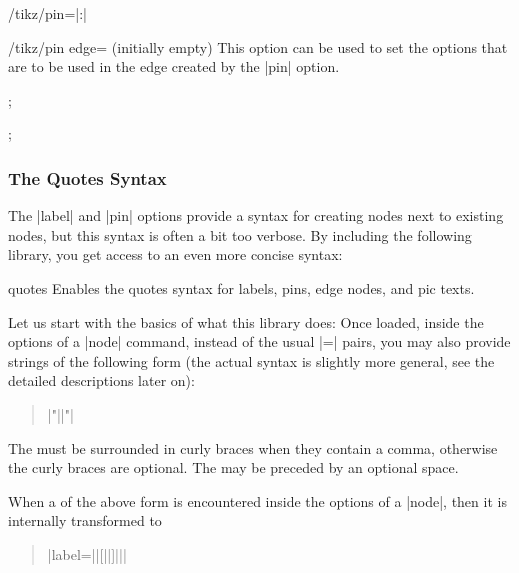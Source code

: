 \begin{key}{/tikz/pin=|:|}
    \begin{key}{/tikz/pin edge= (initially \normalfont empty)}
        This option can be used to set the options that are to be used in the
        edge created by the |pin| option.
\begin{codeexample}[]
\tikz[pin distance=10mm]
  ;
\end{codeexample}
\begin{codeexample}[]
\tikz [every pin edge/.style={},
       initial/.style={pin={[pin distance=5mm,
                             pin edge={<-,shorten <=1pt}]left:start}}]
  ;
\end{codeexample}
    \end{key}
\end{key}


\subsubsection{The Quotes Syntax}
\label{section-label-quotes}

The |label| and |pin| options provide a syntax for creating nodes next to
existing nodes, but this syntax is often a bit too verbose. By including the
following library, you get access to an even more concise syntax:

\begin{tikzlibrary}{quotes}
    Enables the quotes syntax for labels, pins, edge nodes, and pic texts.
\end{tikzlibrary}

Let us start with the basics of what this library does: Once loaded, inside the
options of a |node| command, instead of the usual |=|
pairs, you may also provide strings of the following form (the actual syntax is
slightly more general, see the detailed descriptions later on):
%
\begin{quote}
    |"||"|
\end{quote}
%
The  must be surrounded in curly braces when they contain a
comma, otherwise the curly braces are optional. The  may be
preceded by an optional space.

When a  of the above form is encountered inside the options of a
|node|, then it is internally transformed to
%
\begin{quote}
    |label=||{[||]||}|
\end{quote}

